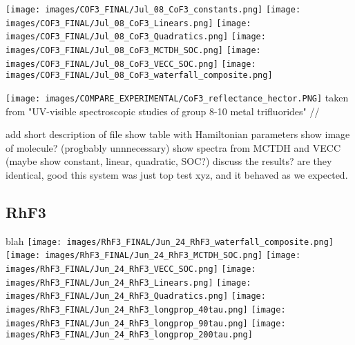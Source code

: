 \texttt{[image: images/COF3\_FINAL/Jul\_08\_CoF3\_constants.png]}
\texttt{[image: images/COF3\_FINAL/Jul\_08\_CoF3\_Linears.png]}
\texttt{[image: images/COF3\_FINAL/Jul\_08\_CoF3\_Quadratics.png]}
\texttt{[image: images/COF3\_FINAL/Jul\_08\_CoF3\_MCTDH\_SOC.png]}
\texttt{[image: images/COF3\_FINAL/Jul\_08\_CoF3\_VECC\_SOC.png]}
\texttt{[image: images/COF3\_FINAL/Jul\_08\_CoF3\_waterfall\_composite.png]}


\texttt{[image: images/COMPARE\_EXPERIMENTAL/CoF3\_reflectance\_hector.PNG]}
taken from "UV-visible spectroscopic studies of group 8-10 metal trifluorides" //



add short description of file
show table with Hamiltonian parameters
show image of molecule? (progbably unnnecessary)
show spectra from MCTDH and VECC (maybe show constant, linear, quadratic, SOC?)
discuss the results? are they identical, good this system was just top test xyz, and it behaved as we expected.
\subsection{RhF3}
blah
\texttt{[image: images/RhF3\_FINAL/Jun\_24\_RhF3\_waterfall\_composite.png]}
\texttt{[image: images/RhF3\_FINAL/Jun\_24\_RhF3\_MCTDH\_SOC.png]}
\texttt{[image: images/RhF3\_FINAL/Jun\_24\_RhF3\_VECC\_SOC.png]}
\texttt{[image: images/RhF3\_FINAL/Jun\_24\_RhF3\_Linears.png]}
\texttt{[image: images/RhF3\_FINAL/Jun\_24\_RhF3\_Quadratics.png]}
\texttt{[image: images/RhF3\_FINAL/Jun\_24\_RhF3\_longprop\_40tau.png]}
\texttt{[image: images/RhF3\_FINAL/Jun\_24\_RhF3\_longprop\_90tau.png]}
\texttt{[image: images/RhF3\_FINAL/Jun\_24\_RhF3\_longprop\_200tau.png]}

